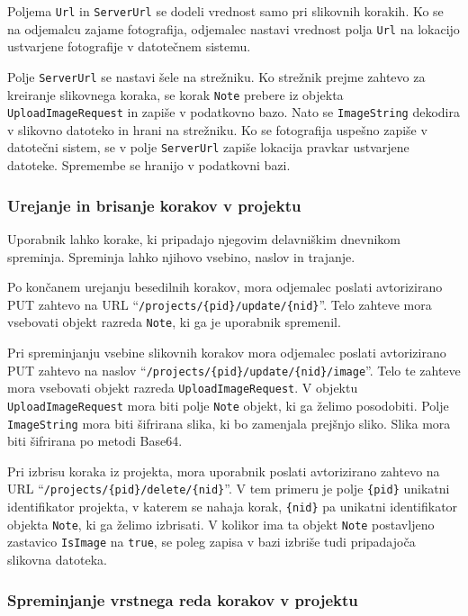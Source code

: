 \documentclass[a4paper, 12pt]{book}
\begin{document}
Poljema \texttt{Url} in \texttt{ServerUrl} se dodeli vrednost samo pri slikovnih korakih.
Ko se na odjemalcu zajame fotografija, odjemalec nastavi vrednost polja \texttt{Url} na lokacijo ustvarjene fotografije v datotečnem sistemu.

Polje \texttt{ServerUrl} se nastavi šele na strežniku.
Ko strežnik prejme zahtevo za kreiranje slikovnega koraka, se korak \texttt{Note} prebere iz objekta \texttt{UploadImageRequest} in zapiše v podatkovno bazo.
Nato se \texttt{ImageString} dekodira v slikovno datoteko in hrani na strežniku.
Ko se fotografija uspešno zapiše v datotečni sistem, se v polje \texttt{ServerUrl} zapiše lokacija pravkar ustvarjene datoteke.
Spremembe se hranijo v podatkovni bazi.

\subsubsection{Urejanje in brisanje korakov v projektu}

Uporabnik lahko korake, ki pripadajo njegovim delavniškim dnevnikom spreminja.
Spreminja lahko njihovo vsebino, naslov in trajanje.

Po končanem urejanju besedilnih korakov, mora odjemalec poslati avtorizirano PUT zahtevo na URL \enquote{\texttt{/projects/\{pid\}/update/\{nid\}}}.
Telo zahteve mora vsebovati objekt razreda \texttt{Note}, ki ga je uporabnik spremenil.

Pri spreminjanju vsebine slikovnih korakov mora odjemalec poslati avtorizirano PUT zahtevo na naslov \enquote{\texttt{/projects/\{pid\}/update/\{nid\}/image}}.
Telo te zahteve mora vsebovati objekt razreda \texttt{UploadImageRequest}.
V objektu \texttt{UploadImageRequest} mora biti polje \texttt{Note} objekt, ki ga želimo posodobiti.
Polje \texttt{ImageString} mora biti šifrirana slika, ki bo zamenjala prejšnjo sliko.
Slika mora biti šifrirana po metodi Base64.

Pri izbrisu koraka iz projekta, mora uporabnik poslati avtorizirano zahtevo na URL \enquote{\texttt{/projects/\{pid\}/delete/\{nid\}}}.
V tem primeru je polje \texttt{\{pid\}} unikatni identifikator projekta, v katerem se nahaja korak, \texttt{\{nid\}} pa unikatni identifikator objekta \texttt{Note}, ki ga želimo izbrisati.
V kolikor ima ta objekt \texttt{Note} postavljeno zastavico \texttt{IsImage} na \texttt{true}, se poleg zapisa v bazi izbriše tudi pripadajoča slikovna datoteka.


\subsubsection{Spreminjanje vrstnega reda korakov v projektu}
\end{document}
